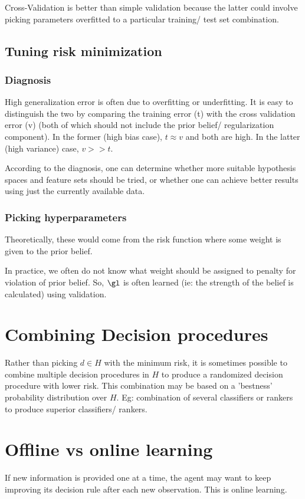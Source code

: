\documentclass[oneside, article]{memoir}
\begin{document}
Cross-Validation is better than simple validation because the latter could involve picking parameters overfitted to a particular training/ test set combination.

\subsection{Tuning risk minimization}
\subsubsection{Diagnosis}
High generalization error is often due to overfitting or underfitting. It is easy to distinguish the two by comparing the training error (t) with the cross validation error (v) (both of which should not include the prior belief/ regularization component). In the former (high bias case), $t \approx v$ and both are high. In the latter (high variance) case, $v >> t$.

According to the diagnosis, one can determine whether more suitable hypothesis spaces and feature sets should be tried, or whether one can achieve better results using just the currently available data.

\subsubsection{Picking hyperparameters}
Theoretically, these would come from the risk function where some weight is given to the prior belief.

In practice, we often do not know what weight should be assigned to penalty for violation of prior belief. So, $\gl$ is often learned (ie: the strength of the belief is calculated) using validation.

\section{Combining Decision procedures}
Rather than picking $d \in H$ with the minimum risk, it is sometimes possible to combine multiple decision procedures in $H$ to produce a randomized decision procedure with lower risk. This combination may be based on a 'bestness' probability distribution over $H$. Eg: combination of several classifiers or rankers to produce superior classifiers/ rankers.

\section{Offline vs online learning}
If new information is provided one at a time, the agent may want to keep improving its decision rule after each new observation. This is online learning.
\end{document}
